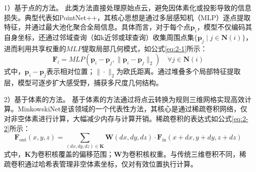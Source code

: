 1）基于点的方法。
此类方法直接处理原始点云，避免因体素化或投影导致的信息损失。典型代表如PointNet++，其核心思想是通过多层感知机（MLP）逐点提取特征，并通过最大池化聚合全局信息。具体而言，对于每个点$\mathbf{p}_i$，模型不仅编码其自身坐标，还通过邻域查询（如k近邻或球查询）收集周围点集$\{\mathbf{p}_j \mid j \in \mathbf{N}(i)\}$，进而利用共享权重的$MLP$提取局部几何模式，如公式\eqref{eq:2-1}所示：
\begin{equation}
    \label{eq:2-1}
    \mathbf{F}_i = MLP\left(\mathbf{p}_i - \mathbf{p}_j, \|\mathbf{p}_i - \mathbf{p}_j\|_2\right) \quad \forall j \in \mathbf{N}(i)
\end{equation}
式中，$\mathbf{p}_i - \mathbf{p}_j$表示相对位置；$\|\cdot\|_2$为欧氏距离。通过堆叠多个局部特征提取层，模型可逐步扩大感受野，捕获多尺度几何结构。

2）基于体素的方法。
基于体素的方法通过将点云转换为规则三维网格实现高效计算。MinkowskiNet是该领域的一个代表性方法，其核心是通过稀疏卷积网络，仅对非空体素进行计算，大幅减少内存与计算开销。稀疏卷积的表达式如公式\eqref{eq:2-2}所示：
\begin{equation}
    \label{eq:2-2}
    \mathbf{F}_{\text{out}}(x,y,z) = \sum_{(dx,dy,dz) \in \mathbf{K}} \mathbf{W}(dx,dy,dz) \cdot \mathbf{F}_{\text{in}}(x+dx, y+dy, z+dz)
\end{equation}
式中，$\mathbf{K}$为卷积核覆盖的偏移范围；$\mathbf{W}$为卷积核权重。与传统三维卷积不同，稀疏卷积通过哈希表管理非空体素坐标，仅对有效位置执行计算。%


